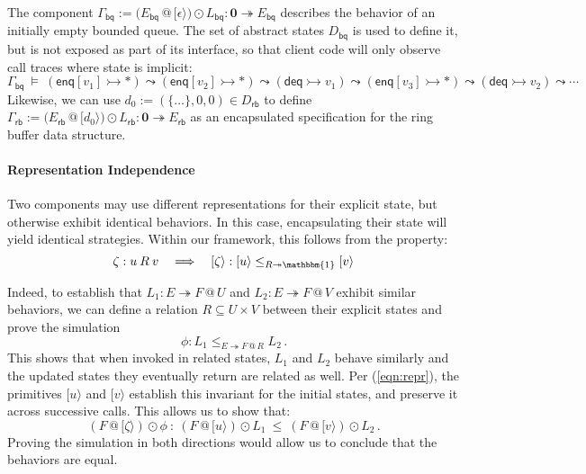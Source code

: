 \documentclass[acmsmall,screen,review,anonymous,nonacm]{acmart}
\newcommand{\kw}[1]{\ensuremath{ \mathsf{#1} }}
\newcommand{\emptysig}{\mathbf0}
\begin{document}
\begin{example} \label{ex:encaps} %
The component
$\Gamma_\kw{bq} :=
 \bigl(E_\kw{bq} \mathbin@ [\epsilon\rangle\bigr) \odot L_\kw{bq} :
 \emptysig \twoheadrightarrow E_\kw{bq}$
describes the behavior of an initially empty bounded queue.
The set of abstract states $D_\kw{bq}$ is used to define it,
but is not exposed as part of its interface,
so that client code will only observe call traces
where state is implicit:
{\small\[
  \Gamma_\kw{bq} \: \vDash \:
    (\kw{enq}[v_1] \rightarrowtail {*}) \leadsto
    (\kw{enq}[v_2] \rightarrowtail {*}) \leadsto
    (\kw{deq} \rightarrowtail v_1) \leadsto
    (\kw{enq}[v_3] \rightarrowtail {*}) \leadsto
    (\kw{deq} \rightarrowtail v_2) \leadsto \cdots
\]}%
Likewise,
we can use
$d_0 := (\{\ldots\}, 0, 0) \in D_\kw{rb}$
to define
$\Gamma_\kw{rb} :=
 \bigl( E_\kw{rb} \mathbin@ [d_0\rangle \bigr) \odot L_\kw{rb} :
 \emptysig \twoheadrightarrow E_\kw{rb}$
as an encapsulated specification for
the ring buffer data structure.
\end{example}

\paragraph{Representation Independence} %

Two components may use different representations
for their explicit state,
but otherwise exhibit identical behaviors.
In this case,
encapsulating their state will yield identical strategies.
Within our framework,
this follows from the property:
\begin{equation} \label{eqn:repr}
  \zeta : u \mathbin{R} v
  \quad\Longrightarrow\quad
  [\zeta\rangle : [u\rangle \le_{R \twoheadrightarrow \mathbbm{1}} [v\rangle
\end{equation}

Indeed,
to establish that
$L_1 : E \twoheadrightarrow F \mathbin@ U$ and
$L_2 : E \twoheadrightarrow F \mathbin@ V$
exhibit similar behaviors,
we can define a relation $R \subseteq U \times V$
between their explicit states and prove the simulation
\[
  \phi : L_1 \le_{E \twoheadrightarrow F \mathbin@ R} L_2
  \,.
\]
This shows that when invoked in related states,
$L_1$ and $L_2$ behave similarly and
the updated states they eventually return are related as well.
Per (\ref{eqn:repr}),
the primitives $[u\rangle$ and $[v\rangle$
establish this invariant for the initial states,
and preserve it across successive calls.
This allows us to show that:
\[
  (F \mathbin@ [\zeta\rangle) \odot \phi \: : \:
  (F \mathbin@ [u\rangle) \odot L_1 \: \le \:
  (F \mathbin@ [v\rangle) \odot L_2
  \,.
\]
Proving the simulation in both directions
would allow us to conclude that the behaviors are equal.
\end{document}
